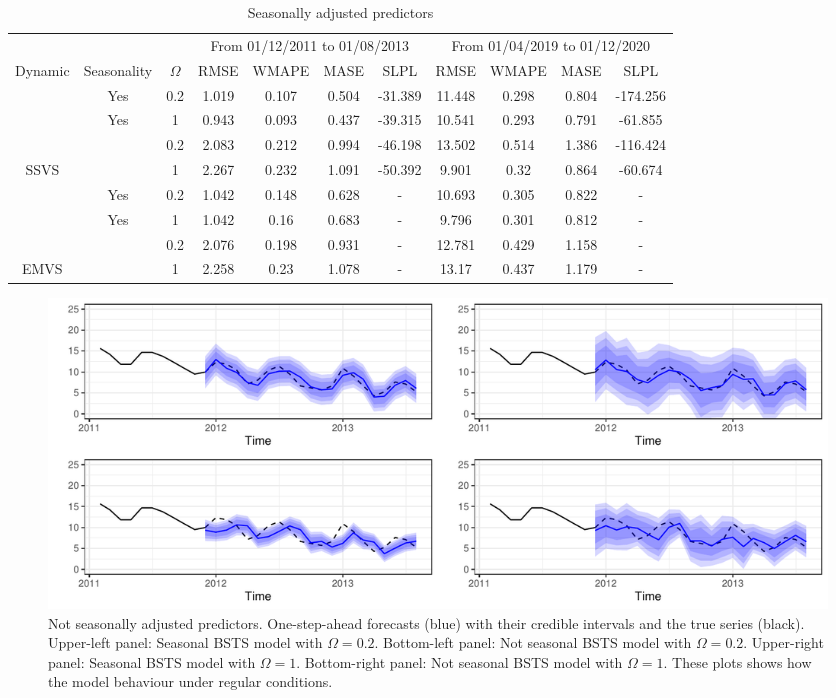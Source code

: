 \documentclass[
  12pt,
]{book}
\theoremstyle{break}
\theoremstyle{nonumberplain}
\begin{document}
\begin{table}[H]

\caption{\label{tab:mytab32}Seasonally adjusted predictors}
\centering
\fontsize{8}{10}\selectfont
\begin{tabular}[t]{>{}ccccccccccc}
\toprule
\multicolumn{3}{c}{ } & \multicolumn{4}{c}{From 01/12/2011 to 01/08/2013} & \multicolumn{4}{c}{From 01/04/2019 to 01/12/2020} \\
\cmidrule(l{3pt}r{3pt}){4-7} \cmidrule(l{3pt}r{3pt}){8-11}
Dynamic & Seasonality & $\Omega$ & RMSE & WMAPE & MASE & SLPL & RMSE & WMAPE & MASE & SLPL\\
\midrule
 & Yes & 0.2 & 1.019 & 0.107 & 0.504 & -31.389 & 11.448 & 0.298 & 0.804 & -174.256\\
\cmidrule{2-11}
 & Yes & 1 & 0.943 & 0.093 & 0.437 & -39.315 & 10.541 & 0.293 & 0.791 & -61.855\\
\cmidrule{2-11}
 &  & 0.2 & 2.083 & 0.212 & 0.994 & -46.198 & 13.502 & 0.514 & 1.386 & -116.424\\
\cmidrule{2-11}
\multirow[t]{-4}{*}{\centering\arraybackslash SSVS} &  & 1 & 2.267 & 0.232 & 1.091 & -50.392 & 9.901 & 0.32 & 0.864 & -60.674\\
\cmidrule{1-11}
 & Yes & 0.2 & 1.042 & 0.148 & 0.628 & - & 10.693 & 0.305 & 0.822 & -\\
\cmidrule{2-11}
 & Yes & 1 & 1.042 & 0.16 & 0.683 & - & 9.796 & 0.301 & 0.812 & -\\
\cmidrule{2-11}
 &  & 0.2 & 2.076 & 0.198 & 0.931 & - & 12.781 & 0.429 & 1.158 & -\\
\cmidrule{2-11}
\multirow[t]{-4}{*}{\centering\arraybackslash EMVS} &  & 1 & 2.258 & 0.23 & 1.078 & - & 13.17 & 0.437 & 1.179 & -\\
\bottomrule
\end{tabular}
\end{table}

\begin{figure}[H]

{\centering \includegraphics{Dynamic-Shrinkage-in-Bayesian-Structural-Time-Series-and-Vector-Autoregressive-Models_files/figure-latex/myfig117-1} 

}

\caption{Not seasonally adjusted predictors. One-step-ahead forecasts (blue) with their credible intervals and the true series (black). Upper-left panel: Seasonal BSTS model with $\Omega=0.2$. Bottom-left panel: Not seasonal BSTS model with $\Omega=0.2$. Upper-right panel: Seasonal BSTS model with $\Omega=1$. Bottom-right panel: Not seasonal BSTS model with $\Omega=1$. These plots shows how the model behaviour under regular conditions.}\label{fig:myfig117}
\end{figure}
\end{document}

